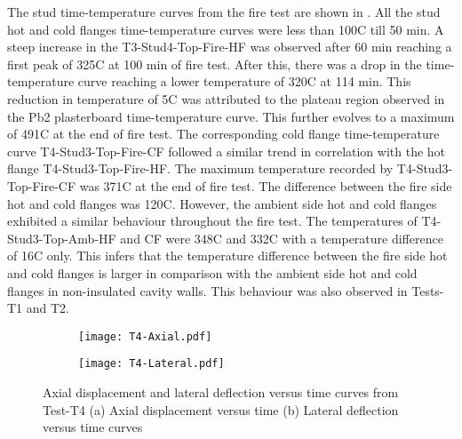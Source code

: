 The stud time-temperature curves from the fire test are shown in . All the stud hot and cold flanges time-temperature curves were less than 100\degree C till 50 min. A steep increase in the T3-Stud4-Top-Fire-HF was observed after 60 min reaching a first peak of 325\degree C at 100 min of fire test. After this, there was a drop in the time-temperature curve reaching a lower temperature of 320\degree C at 114 min. This reduction in temperature of 5\degree C was attributed to the plateau region observed in the Pb2 plasterboard time-temperature curve. This further evolves to a maximum of 491\degree C at the end of fire test. The corresponding cold flange time-temperature curve T4-Stud3-Top-Fire-CF followed a similar trend in correlation with the hot flange T4-Stud3-Top-Fire-HF. The maximum temperature recorded by T4-Stud3-Top-Fire-CF was 371\degree C at the end of fire test. The difference between the fire side hot and cold flanges was 120\degree C. However, the ambient side hot and cold flanges exhibited a similar behaviour throughout the fire test. The temperatures of T4-Stud3-Top-Amb-HF and CF were 348\degree C and 332\degree C with a temperature difference of 16\degree C only. This infers that the temperature difference between the fire side hot and cold flanges is larger in comparison with the ambient side hot and cold flanges in non-insulated cavity walls. This behaviour was also observed in Tests-T1 and T2.
\begin{figure}[!htbp]
	\centering
	\begin{subfigure}[b]{0.7\textwidth}
		\centering
		\texttt{[image: T4-Axial.pdf]}
		\caption{}
		\label{subfig:T4-Axial}
	\end{subfigure}
	\begin{subfigure}[b]{0.7\textwidth}
		\centering
		\texttt{[image: T4-Lateral.pdf]}
		\caption{}
		\label{subfig:T4-Lateral}
	\end{subfigure}
	   \caption{Axial displacement and lateral deflection versus time curves from Test-T4 (a) Axial displacement versus time (b) Lateral deflection versus time curves}
	   \label{fig:T4-Axial-Lateral}
\end{figure}

